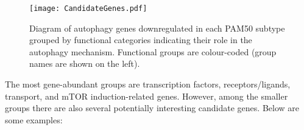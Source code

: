            \begin{figure}[!h]
            \centering
            \texttt{[image: CandidateGenes.pdf]} 
            \caption[Diagram of candidate autophagy genes in subtypes, grouped by function]{Diagram of autophagy genes downregulated in each PAM50 subtype grouped by functional categories indicating their role in the autophagy mechanism. Functional groups are colour-coded (group names are shown on the left). }
            \label{fig:candidategenes}
            \end{figure}
            
\newpage
The most gene-abundant groups are transcription factors, receptors/ligands, transport, and mTOR induction-related genes. However, among the smaller groups there are also several potentially interesting candidate genes. Below are some examples: 

